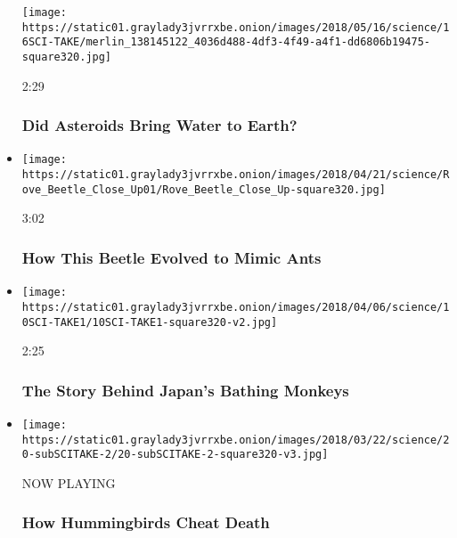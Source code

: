 \begin{itemize}
  \texttt{[image: https://static01.graylady3jvrrxbe.onion/images/2018/05/16/science/16SCI-TAKE/merlin\_138145122\_4036d488-4df3-4f49-a4f1-dd6806b19475-square320.jpg]}

  2:29

  \hypertarget{did-asteroids-bring-water-to-earth}{%
  \subsubsection{Did Asteroids Bring Water to
  Earth?}\label{did-asteroids-bring-water-to-earth}}
\item
  \href{https://www.nytimes3xbfgragh.onion/video/science/100000005813865/how-this-beetle-evolved-to-mimic-ants.html?action=click\&module=video-series-bar\&region=header\&pgtype=Article\&playlistId=video/sciencetake}{}

  \texttt{[image: https://static01.graylady3jvrrxbe.onion/images/2018/04/21/science/Rove\_Beetle\_Close\_Up01/Rove\_Beetle\_Close\_Up-square320.jpg]}

  3:02

  \hypertarget{how-this-beetle-evolved-to-mimic-ants}{%
  \subsubsection{How This Beetle Evolved to Mimic
  Ants}\label{how-this-beetle-evolved-to-mimic-ants}}
\item
  \href{https://www.nytimes3xbfgragh.onion/video/science/100000005800676/the-story-behind-japans-bathing-monkeys.html?action=click\&module=video-series-bar\&region=header\&pgtype=Article\&playlistId=video/sciencetake}{}

  \texttt{[image: https://static01.graylady3jvrrxbe.onion/images/2018/04/06/science/10SCI-TAKE1/10SCI-TAKE1-square320-v2.jpg]}

  2:25

  \hypertarget{the-story-behind-japans-bathing-monkeys}{%
  \subsubsection{The Story Behind Japan's Bathing
  Monkeys}\label{the-story-behind-japans-bathing-monkeys}}
\item
  \texttt{[image: https://static01.graylady3jvrrxbe.onion/images/2018/03/22/science/20-subSCITAKE-2/20-subSCITAKE-2-square320-v3.jpg]}

  NOW PLAYING

  \hypertarget{how-hummingbirds-cheat-death-2}{%
  \subsubsection{How Hummingbirds Cheat
  Death}\label{how-hummingbirds-cheat-death-2}}
\end{itemize}

